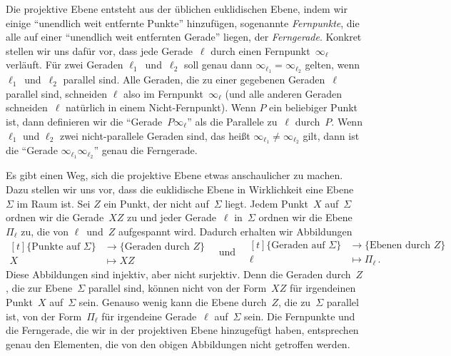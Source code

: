 Die projektive Ebene entsteht aus der üblichen euklidischen Ebene, indem wir einige \enquote{unendlich weit entfernte Punkte} hinzufügen, sogenannte \emph{Fernpunkte}, die alle auf einer \enquote{unendlich weit entfernten Gerade} liegen, der \emph{Ferngerade}. Konkret stellen wir uns dafür vor, dass jede Gerade~$\ell$ durch einen Fernpunkt~$\infty_\ell$ verläuft. Für zwei Geraden $\ell_1$~und~$\ell_2$ soll genau dann $\infty_{\ell_1}=\infty_{\ell_2}$ gelten, wenn $\ell_1$~und~$\ell_2$ parallel sind. Alle Geraden, die zu einer gegebenen Geraden~$\ell$ parallel sind, schneiden $\ell$ also im Fernpunkt~$\infty_\ell$ (und alle anderen Geraden schneiden~$\ell$ natürlich in einem Nicht-Fernpunkt). Wenn $P$ ein beliebiger Punkt ist, dann definieren wir die \enquote{Gerade~$P\infty_\ell$} als die Parallele zu~$\ell$ durch~$P$. Wenn $\ell_1$ und $\ell_2$ zwei nicht-parallele Geraden sind, das heißt $\infty_{\ell_1}\neq \infty_{\ell_2}$ gilt, dann ist die \enquote{Gerade $\infty_{\ell_1}\infty_{\ell_2}$} genau die Ferngerade.

Es gibt einen Weg, sich die projektive Ebene etwas anschaulicher zu machen. Dazu stellen wir uns vor, dass die euklidische Ebene in Wirklichkeit eine Ebene~$\Sigma$ im Raum ist. Sei $Z$ ein Punkt, der nicht auf~$\Sigma$ liegt. Jedem Punkt~$X$ auf~$\Sigma$ ordnen wir die Gerade~$XZ$ zu und jeder Gerade~$\ell$ in~$\Sigma$ ordnen wir die Ebene~$\Pi_\ell$ zu, die von $\ell$~und~$Z$ aufgespannt wird. Dadurch erhalten wir Abbildungen	
\begin{equation*}
	\begin{aligned}[t]
		\{\text{Punkte auf~$\Sigma$}\}&\longrightarrow \{\text{Geraden durch~$Z$}\}\\
		X&\longmapsto XZ
	\end{aligned}\quad\text{und}\quad 
	\begin{aligned}[t]
		\{\text{Geraden auf~$\Sigma$}\} & \longrightarrow \{\text{Ebenen durch~$Z$}\}\\
		\ell & \longmapsto \Pi_\ell\,.
	\end{aligned}
\end{equation*}
Diese Abbildungen sind injektiv, aber nicht surjektiv. Denn die Geraden durch~$Z$, die zur Ebene~$\Sigma$ parallel sind, können nicht von der Form~$XZ$ für irgendeinen Punkt~$X$ auf~$\Sigma$ sein. Genauso wenig kann die Ebene durch~$Z$, die zu~$\Sigma$ parallel ist, von der Form~$\Pi_\ell$ für irgendeine Gerade~$\ell$ auf~$\Sigma$ sein. Die Fernpunkte und die Ferngerade, die wir in der projektiven Ebene hinzugefügt haben, entsprechen genau den Elementen, die von den obigen Abbildungen nicht getroffen werden.

